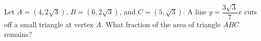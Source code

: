 Let $A=(4,2\sqrt3)$, $B=(6,2\sqrt3)$, and $C=(5,\sqrt3)$. A line $y=\dfrac{3\sqrt3}{7}x$ cuts off a small triangle at vertex $A$. What fraction of the area of triangle $ABC$ remains?
